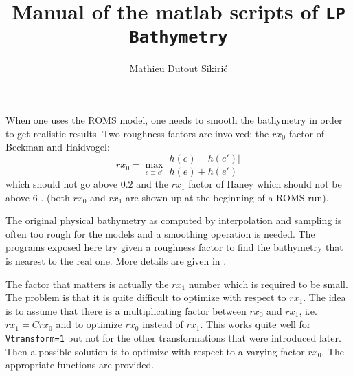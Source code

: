\documentclass[12pt]{article}
\title{Manual of the matlab scripts of {\tt LP Bathymetry}}
\author{Mathieu Dutout Sikiri\'c}
\begin{document}
\newcommand{\RR}{\ensuremath{\mathbb{R}}}
\newcommand{\NN}{\ensuremath{\mathbb{N}}}
\newcommand{\QQ}{\ensuremath{\mathbb{Q}}}
\newcommand{\CC}{\ensuremath{\mathbb{C}}}
\newcommand{\ZZ}{\ensuremath{\mathbb{Z}}}
\newcommand{\TT}{\ensuremath{\mathbb{T}}}
\newtheorem{proposition}{Proposition}
\newtheorem{theorem}{Theorem}
\newtheorem{corollary}{Corollary}
\newtheorem{lemma}{Lemma}
\newtheorem{problem}{Problem}
\newtheorem{conjecture}{Conjecture}
\newtheorem{claim}{Claim}
\newtheorem{remark}{Remark}
\newtheorem{definition}{Definition}
\newcommand{\qed}{\hfill $\Box$ }
\newcommand{\proof}{\noindent{\bf Proof.}\ \ }



\maketitle


When one uses the ROMS model, one needs to smooth the bathymetry in
order to get realistic results.
Two roughness factors are involved: the $rx_0$ factor of 
Beckman and Haidvogel:
\begin{equation*}
rx_0=\max_{e\equiv e'} \frac{|h(e) - h(e')|}{h(e)+h(e')}
\end{equation*}
which should not go above $0.2$ and the $rx_1$ factor of Haney which
should not be above $6$ \cite{haney}.
(both $rx_0$ and $rx_1$ are shown up at the beginning of a ROMS run).

The original physical bathymetry as computed by interpolation and 
sampling is often too rough for the models and a smoothing operation
is needed.
The programs exposed here try given a roughness factor to find the
bathymetry that is nearest to the real one. 
More details are given in \cite{lpmeth}.

The factor that matters is actually the $rx_1$ number which is required
to be small. The problem is that it is quite difficult to optimize with
respect to $rx_1$. The idea is to assume that there is a multiplicating
factor between $rx_0$ and $rx_1$, i.e. $rx_1= C rx_0$ and to optimize
$rx_0$ instead of $rx_1$.
This works quite well for {\tt Vtransform=1} but not for the other
transformations that were introduced later. Then a possible solution
is to optimize with respect to a varying factor $rx_0$. The appropriate
functions are provided.

\end{document}
